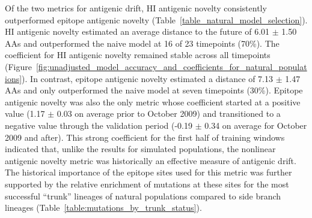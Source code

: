 Of the two metrics for antigenic drift, HI antigenic novelty consistently outperformed epitope antigenic novelty (Table~\ref{table_natural_model_selection}).
HI antigenic novelty estimated an average distance to the future of 6.01 $\pm$ 1.50 AAs and outperformed the naive model at 16 of 23 timepoints (70\%).
The coefficient for HI antigenic novelty remained stable across all timepoints (Figure~\ref{fig:unadjusted_model_accuracy_and_coefficients_for_natural_populations}).
In contrast, epitope antigenic novelty estimated a distance of 7.13 $\pm$ 1.47 AAs and only outperformed the naive model at seven timepoints (30\%).
Epitope antigenic novelty was also the only metric whose coefficient started at a positive value (1.17 $\pm$ 0.03 on average prior to October 2009) and transitioned to a negative value through the validation period (-0.19 $\pm$ 0.34 on average for October 2009 and after).
This strong coefficient for the first half of training windows indicated that, unlike the results for simulated populations, the nonlinear antigenic novelty metric was historically an effective measure of antigenic drift.
The historical importance of the epitope sites used for this metric was further supported by the relative enrichment of mutations at these sites for the most successful ``trunk'' lineages of natural populations compared to side branch lineages (Table~\ref{table:mutations_by_trunk_status}).

